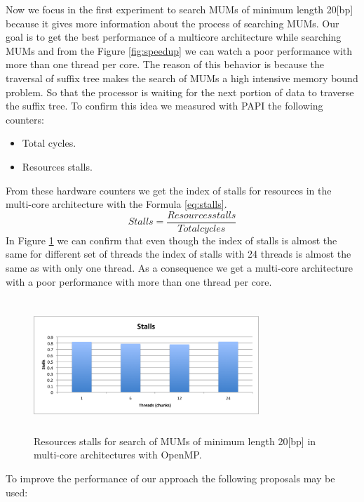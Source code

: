 \documentclass[3p,times]{elsarticle}
\begin{document}
 Now we focus in the first experiment to search MUMs of minimum length 20[bp] because it gives more information about the process of searching MUMs. Our goal is to get the best performance of a multicore architecture while searching MUMs and from the Figure \ref{fig:speedup} we can watch a poor performance with more than one thread per core. The reason of this behavior is because the traversal of suffix tree makes the search of MUMs a high intensive memory bound problem. So that the processor is waiting for the next portion of data to traverse the suffix tree. To confirm this idea we measured with PAPI the following counters:
 \begin{itemize}
   \item Total cycles.
   \item Resources stalls.
 \end{itemize}
 From these hardware counters we get the index of stalls for resources in the multi-core architecture with the Formula \ref{eq:stalls}.
 \begin{equation}
   Stalls=\frac{Resources stalls}{Total cycles}
   \label{eq:stalls}
 \end{equation}
 In Figure \ref{fig:stalls} we can confirm that even though the index of stalls is almost the same for different set of threads the index of stalls with 24 threads is almost the same as with only one thread. As a consequence we get a multi-core architecture with a poor performance with more than one thread per core.
 \begin{figure}[htb]
  \centering
  \includegraphics[width=8.5cm,height=5cm]{stalls.png}
  \caption{Resources stalls for search of MUMs of minimum length 20[bp] in multi-core architectures with OpenMP.}
  \label{fig:stalls}
 \end{figure}  
 To improve the performance of our approach the following proposals may be used:
\end{document}

